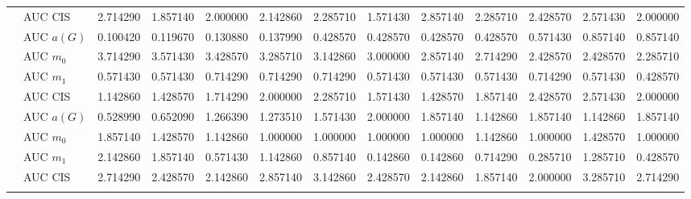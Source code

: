 \begin{table}[htbp]
\begin{tabular}{llrrrrrrrrrrr}
    & AUC CIS & 2.714290 & 1.857140 & 2.000000 & 2.142860 & 2.285710 & 1.571430 & 2.857140 & 2.285710 & 2.428570 & 2.571430 & 2.000000 \\
    \addlinespace
    \multirow{4}{*}{degree} & AUC $a(G)$ & 0.100420 & 0.119670 & 0.130880 & 0.137990 & 0.428570 & 0.428570 & 0.428570 & 0.428570 & 0.571430 & 0.857140 & 0.857140 \\
    & AUC $m_0$ & 3.714290 & 3.571430 & 3.428570 & 3.285710 & 3.142860 & 3.000000 & 2.857140 & 2.714290 & 2.428570 & 2.428570 & 2.285710 \\
    & AUC $m_1$ & 0.571430 & 0.571430 & 0.714290 & 0.714290 & 0.714290 & 0.571430 & 0.571430 & 0.571430 & 0.714290 & 0.571430 & 0.428570 \\
    & AUC CIS & 1.142860 & 1.428570 & 1.714290 & 2.000000 & 2.285710 & 1.571430 & 1.428570 & 1.857140 & 2.428570 & 2.571430 & 2.000000 \\
    \addlinespace
    \multirow{4}{*}{random} & AUC $a(G)$ & 0.528990 & 0.652090 & 1.266390 & 1.273510 & 1.571430 & 2.000000 & 1.857140 & 1.142860 & 1.857140 & 1.142860 & 1.857140 \\
    & AUC $m_0$ & 1.857140 & 1.428570 & 1.142860 & 1.000000 & 1.000000 & 1.000000 & 1.000000 & 1.142860 & 1.000000 & 1.428570 & 1.000000 \\
    & AUC $m_1$ & 2.142860 & 1.857140 & 0.571430 & 1.142860 & 0.857140 & 0.142860 & 0.142860 & 0.714290 & 0.285710 & 1.285710 & 0.428570 \\
    & AUC CIS & 2.714290 & 2.428570 & 2.142860 & 2.857140 & 3.142860 & 2.428570 & 2.142860 & 1.857140 & 2.000000 & 3.285710 & 2.714290 \\
    \addlinespace
    \bottomrule
  \end{tabular}
\end{table}

